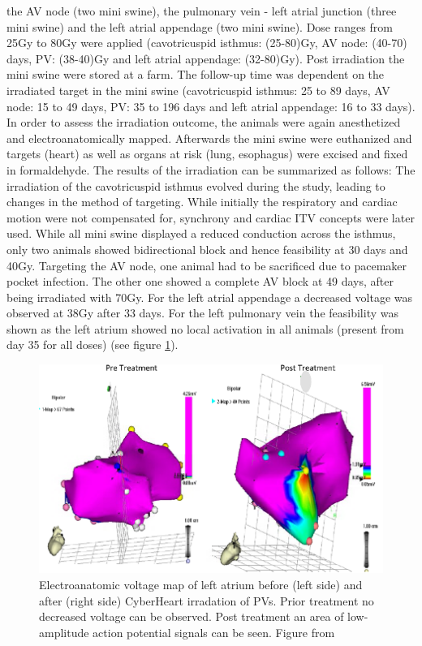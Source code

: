the AV node (two mini swine), the pulmonary vein - left atrial junction (three mini swine) and the left atrial appendage (two mini swine). 
Dose ranges from 25Gy to 80Gy were applied (cavotricuspid isthmus: (25-80)Gy, AV node: (40-70) days, PV: (38-40)Gy and left atrial 
appendage: (32-80)Gy). Post irradiation the mini swine were stored at a farm. The follow-up time was dependent on the irradiated target in 
the mini swine (cavotricuspid isthmus: 25 to 89 days, AV node: 15 to 49 days, PV: 35 to 196 days and left atrial appendage: 16 to 33 days). 
In order to assess the irradiation outcome, the animals were again anesthetized and electroanatomically mapped. Afterwards the mini swine 
were euthanized and targets (heart) as well as organs at risk (lung, esophagus) were excised and fixed in formaldehyde. The results of the 
irradiation can be summarized as follows:
The irradiation of the cavotricuspid isthmus evolved during the study, leading to changes in the method of targeting. While initially the 
respiratory and cardiac motion were not compensated for, synchrony and cardiac ITV concepts were later used. While all mini swine 
displayed a reduced conduction across the isthmus, only two animals showed bidirectional block and hence feasibility at 30 days and 40Gy.   
Targeting the AV node, one animal had to be sacrificed due to pacemaker pocket infection. The other one showed a complete AV block at 49 days, 
after being irradiated with 70Gy. For the left atrial appendage a decreased voltage was observed at 38Gy after 33 days. For the left 
pulmonary vein the feasibility was shown as the left atrium showed no local activation in all animals (present from day 35 for all doses) 
(see figure \ref{LA_map}).

\begin{figure}[H]
\begin{center}
\includegraphics[scale=0.45]{./teile/introduction/cyberheart_voltagemap.png}
\caption{Electroanatomic voltage map of left atrium before (left side) and after (right side) CyberHeart irradation of PVs. Prior treatment 
no decreased voltage can be observed. Post treatment an area of low-amplitude action potential signals can be seen. Figure from \cite{Sha10}}
\label{LA_map}
\end{center}
\end{figure}

